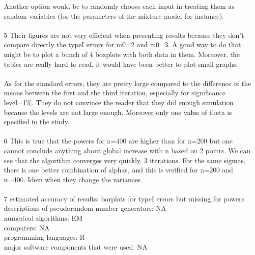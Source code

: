 \documentclass{llncs}\usepackage[]{graphicx}\usepackage[]{color}
\begin{document}
Another option would be to randomly choose each input in treating them as random variables (for the parameters of the mixture model for instance).
\\\\
5
Their figures are not very efficient when presenting results because they don't compare directly the typeI errors for m0=2 and m0=3. A good way to do that might be to plot a bunch of 4 boxplots with both data in them.
Moreover, the tables are really hard to read, it would have been better to plot small graphs.
\\\\
As for the standard errors, they are pretty large compared to the difference of the means between the first and the third iteration, especially for significance level=1\%. They do not convince the reader that they did enough simulation because the levels are not large enough. Moreover only one value of theta is specified in the study.
\\\\
6
This is true that the powers for n=400 are higher than for n=200 but one cannot conclude anything about global increase with n based on 2 points.
We can see that the algorithm converges very quickly, 3 iterations.
For the same sigmas, there is one better combination of alphas, and this is verified for n=200 and n=400. Idem when they change the variances.
\\\\
7
estimated accuracy of results: barplots for typeI errors but missing for powers\\
descriptions of pseudorandom-number generators: NA\\
numerical algorithms: EM\\
computers: NA\\
programming languages: R\\
major software components that were used: NA\\

\section{}
\end{document}
